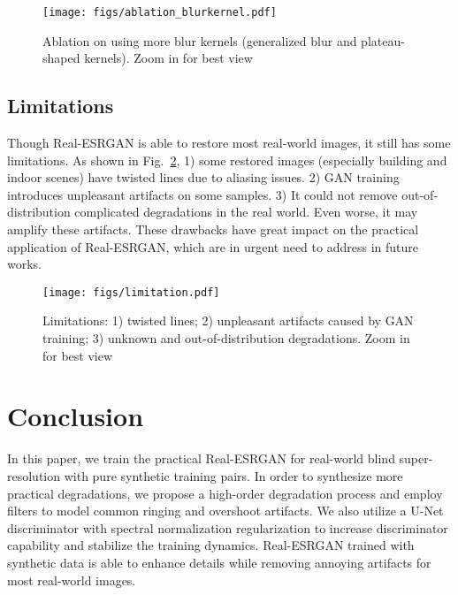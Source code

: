 \documentclass[10pt,twocolumn,letterpaper]{article}
\begin{document}
\begin{figure}[t]
	\vspace{-0.2cm}
	\begin{center}
\texttt{[image: figs/ablation\_blurkernel.pdf]}
	\end{center}
	\vspace{-0.7cm}
	\caption{Ablation on using more blur kernels (generalized blur and plateau-shaped kernels). Zoom in for best view}
	\label{fig:ablation_blurkernel}
\end{figure}

\subsection{Limitations}
\vspace{-0.2cm}
Though Real-ESRGAN is able to restore most real-world images, it still has some limitations.
As shown in Fig.~\ref{fig:limitation},
1) some restored images (especially building and indoor scenes) have twisted lines due to aliasing issues.
2) GAN training introduces unpleasant artifacts on some samples.
3) It could not remove out-of-distribution complicated degradations in the real world. Even worse, it may amplify these artifacts.
These drawbacks have great impact on the practical application of Real-ESRGAN, which are in urgent need to address in future works.

\begin{figure}[t]
	\vspace{-0.2cm}
	\begin{center}
\texttt{[image: figs/limitation.pdf]}
	\end{center}
	\vspace{-0.6cm}
	\caption{Limitations: 1) twisted lines; 2) unpleasant artifacts caused by GAN training; 3) unknown and out-of-distribution degradations. Zoom in for best view}
	\label{fig:limitation}
	\vspace{-0.5cm}
\end{figure}

 

\section{Conclusion}
\vspace{-0.2cm}
In this paper, we train the practical Real-ESRGAN for real-world blind super-resolution with pure synthetic training pairs.
In order to synthesize more practical degradations, we propose a high-order degradation process and employ  filters to model common ringing and overshoot artifacts.
We also utilize a U-Net discriminator with spectral normalization regularization to increase discriminator capability and stabilize the training dynamics.
Real-ESRGAN trained with synthetic data is able to enhance details while removing annoying artifacts for most real-world images.
\vspace{0.2cm}
\end{document}
